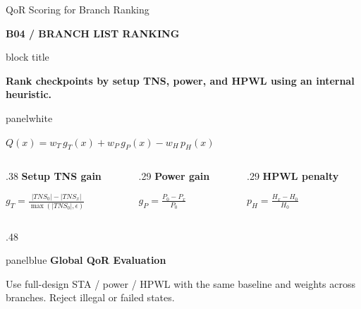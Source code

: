 \documentclass[aspectratio=169,10pt]{beamer}
\newcommand{\smalllabel}[1]{{\scriptsize\bfseries\color{Accent}\MakeUppercase{#1}}}
\newcommand{\takeaway}[1]{%
  \begin{beamercolorbox}[rounded=true,sep=0.15cm,wd=\linewidth]{block title}%
    \strut\textbf{#1}\strut
  \end{beamercolorbox}%
}
\newcommand{\smallpanel}[3]{%
  \begin{beamercolorbox}[rounded=true,sep=0.13cm,wd=\linewidth]{#1}%
    {\small\bfseries\color{Accent}#2}\par\vspace{0.06cm}
    {\scriptsize\color{Ink}#3}%
  \end{beamercolorbox}%
}
\newcommand{\slidenavigation}{}
\newcommand{\slideposition}{}
\newcommand{\slidesubtitle}[1]{%
  \smalllabel{#1}%
}
\begin{document}
\renewcommand{\slidenavigation}{\hyperlink{details-index}{\beamerbutton{Details index}}\hspace{.12cm}\hyperlink{summary-8}{\beamerreturnbutton{Summary 8}}}
\renewcommand{\slideposition}{Backup 4 / 7}
\begin{frame}[shrink=12,label=detail-quality]{QoR Scoring for Branch Ranking}

  \slidesubtitle{B04 / Branch List Ranking}\par\vspace{.12cm}
  \takeaway{Rank checkpoints by setup TNS, power, and HPWL using an internal heuristic.}
  \vspace{.14cm}
  \begin{beamercolorbox}[rounded=true,sep=.14cm,wd=\linewidth]{panelwhite}
    {\centering\Large $\displaystyle Q(x) = w_T\,g_T(x) + w_P\,g_P(x) - w_H\,p_H(x)$\par\vspace{.26cm}}
    \vspace{-.15cm}
    \begin{columns}[T,onlytextwidth]
      \begin{column}{.38\linewidth}\centering
        {\small\bfseries\color{Accent}Setup TNS gain}
        \par\vspace{.12cm}$\displaystyle g_T=\frac{|TNS_0|-|TNS_x|}{\max(|TNS_0|,\epsilon)}$
      \end{column}
      \begin{column}{.29\linewidth}\centering
        {\small\bfseries\color{Accent}Power gain}
        \par\vspace{.12cm}$\displaystyle g_P=\frac{P_0-P_x}{P_0}$
      \end{column}
      \begin{column}{.29\linewidth}\centering
        {\small\bfseries\color{Accent}HPWL penalty}
        \par\vspace{.12cm}$\displaystyle p_H=\frac{H_x-H_0}{H_0}$
      \end{column}
    \end{columns}
  \end{beamercolorbox}
  \vspace{.15cm}
  \begin{columns}[T,onlytextwidth]
    \begin{column}{.48\textwidth}
      \smallpanel{panelblue}{Global QoR Evaluation}{Use full-design STA / power / HPWL with the same baseline and weights across branches. Reject illegal or failed states.}

\end{column}
\end{columns}
\end{frame}
\end{document}
